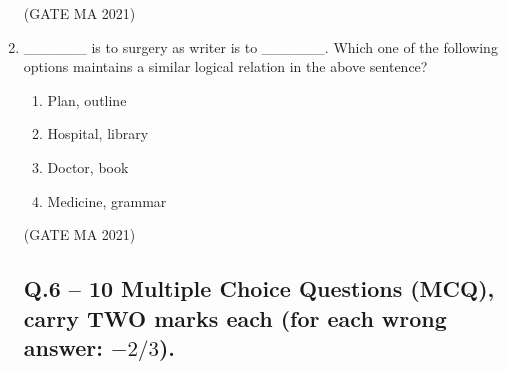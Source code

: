 \documentclass[journal,12pt,onecolumn]{IEEEtran}
\theoremstyle{remark}
\begin{document}
\begin{enumerate}
\begin{enumerate}
        
    \end{enumerate}
\hfill(GATE MA 2021)
    \item \_\_\_\_\_\_ is to surgery as writer is to \_\_\_\_\_\_. Which one of the following options maintains a similar logical relation in the above sentence?
    \begin{enumerate}
        \item Plan, outline
        \item Hospital, library
        \item Doctor, book
        \item Medicine, grammar
    \end{enumerate}
\hfill(GATE MA 2021)

\subsection*{Q.6 -- 10 Multiple Choice Questions (MCQ), carry TWO marks each (for each wrong answer: $-2/3$).}


\end{enumerate}
\end{document}
